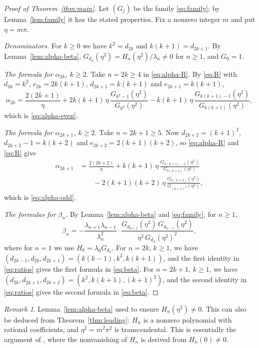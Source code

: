 \documentclass[11pt]{amsart}
\theoremstyle{remark}
\newtheorem{remark}[theorem]{Remark}
\numberwithin{equation}{section}
\begin{document}
\begin{proof}[Proof of Theorem~\ref{thm:main}]
Let $(G_j)$ be the family \eqref{eq:family}; by Lemma~\ref{lem:family} it has the stated properties. Fix a nonzero integer $m$ and put $\eta=m\pi$.

\emph{Denominators.} For $k\ge0$ we have $k^2=d_{2k}$ and $k(k+1)=d_{2k+1}$. By Lemma~\ref{lem:alpha-beta}, $G_{d_n}(\eta^2)=H_n(\eta^2)/\lambda_n\ne0$ for $n\ge1$, and $G_0=1$.

\emph{The formula for $\alpha_{2k}$, $k\ge2$.} Take $n=2k\ge4$ in \eqref{eq:alpha-R}. By \eqref{eq:R} with $d_{2k}=k^2$, $e_{2k}=2k(k+1)$, $d_{2k+1}=k(k+1)$ and $e_{2k+1}=k(k+1)$,
\[
\alpha_{2k}=\frac{2(2k+1)}\eta+2k(k+1)\,\eta\,\frac{G_{k^2-1}(\eta^2)}{G_{k^2}(\eta^2)}-k(k+1)\,\eta\,\frac{G_{k(k+1)-1}(\eta^2)}{G_{k(k+1)}(\eta^2)},
\]
which is \eqref{eq:alpha-even}.

\emph{The formula for $\alpha_{2k+1}$, $k\ge2$.} Take $n=2k+1\ge5$. Now $d_{2k+2}=(k+1)^2$, $d_{2k+2}-1=k(k+2)$ and $e_{2k+2}=2(k+1)(k+2)$, so \eqref{eq:alpha-R} and \eqref{eq:R} give
\begin{align*}
\alpha_{2k+1}&=\frac{2(2k+2)}\eta+k(k+1)\,\eta\,\frac{G_{k(k+1)-1}(\eta^2)}{G_{k(k+1)}(\eta^2)}\\
&\qquad-2(k+1)(k+2)\,\eta\,\frac{G_{k(k+2)}(\eta^2)}{G_{(k+1)^2}(\eta^2)},
\end{align*}
which is \eqref{eq:alpha-odd}.

\emph{The formulas for $\beta_n$.} By Lemma~\ref{lem:alpha-beta} and \eqref{eq:family}, for $n\ge1$,
\[
\beta_n=-\frac{\lambda_{n+1}\lambda_{n-1}}{\lambda_n^2}\cdot\frac{G_{d_{n+1}}(\eta^2)\,G_{d_{n-1}}(\eta^2)}{\eta^2\,G_{d_n}(\eta^2)^2},
\]
where for $n=1$ we use $H_0=\lambda_0G_{d_0}$. For $n=2k$, $k\ge1$, we have $(d_{2k-1},d_{2k},d_{2k+1})=(k(k-1),k^2,k(k+1))$, and the first identity in \eqref{eq:ratios} gives the first formula in \eqref{eq:beta}. For $n=2k+1$, $k\ge1$, we have $(d_{2k},d_{2k+1},d_{2k+2})=(k^2,k(k+1),(k+1)^2)$, and the second identity in \eqref{eq:ratios} gives the second formula in \eqref{eq:beta}.
\end{proof}

\begin{remark}\label{rem:existence}
Lemma~\ref{lem:alpha-beta} used \cite[Theorem~2.3]{MC} to ensure $H_n(\eta^2)\ne0$. This can also be deduced from Theorem~\ref{thm:leading}: $H_n$ is a nonzero polynomial with rational coefficients, and $\eta^2=m^2\pi^2$ is transcendental. This is essentially the argument of \cite{MC}, where the nonvanishing of $H_n$ is derived from $H_n(0)\neq0$.
\end{remark}
\end{document}
